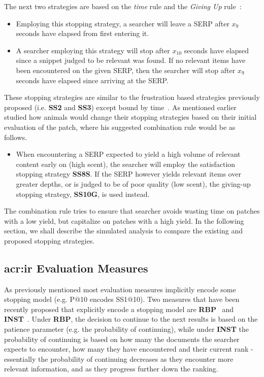 The next two strategies are based on the \emph{time} rule and the \emph{Giving Up} rule~\cite{gibbs1958number_rule}:

\begin{itemize}
    \item[\blueboxbold{SS9}] Employing this stopping strategy, a searcher will leave a SERP after $x_9$ seconds have elapsed from first entering it.
\end{itemize}

\begin{itemize}
    \item[\blueboxbold{SS10}] A searcher employing this strategy will stop after $x_10$ seconds have elapsed since a snippet judged to be relevant was found. If no relevant items have been encountered on the given SERP, then the searcher will stop after $x_9$ seconds have elapsed since arriving at the SERP.
\end{itemize}

These stopping strategies are similar to the frustration based strategies previously proposed (i.e. \textbf{SS2} and \textbf{SS3}) except bound by time~\cite{gibbs1958number_rule}. As mentioned earlier ~\citet{mcnair1982gut_mvt} studied how animals would change their stopping strategies based on their initial evaluation  of the patch, where his suggested combination rule would be as follows.

\begin{itemize}
    \item[\blueboxbold{SS11}] When encountering a SERP expected to yield a high volume of relevant content early on (high scent), the searcher will employ the satisfaction stopping strategy \textbf{SS8S}. If the SERP however yields relevant items over greater depths, or is judged to be of poor quality (low scent), the giving-up stopping strategy, \textbf{SS10G}, is used instead.
\end{itemize}

The combination rule tries to ensure that searcher avoids wasting time on patches with a low yield, but capitalize on patches with a high yield. In the following section, we shall describe the simulated analysis to compare the existing and proposed stopping strategies.

\subsection{\gls{acr:ir} Evaluation Measures}
As previously mentioned most evaluation measures implicitly encode some stopping model (e.g. P$@$10 encodes SS1$@$10). Two measures that have been recently proposed that explicitly encode a stopping model are \textbf{RBP}~\cite{moffat2008rbp} and \textbf{INST}~\cite{bailey2015inst, moffat2015inst}. 
Under \textbf{RBP}, the decision to continue to the next results is based on the patience parameter (e.g. the probability of continuing), while under \textbf{INST} the probability of continuing is based on how many the documents the searcher expects to encounter, how many they have encountered and their current rank - essentially the probability of continuing decreases as they encounter more relevant information, and as they progress further down the ranking.

